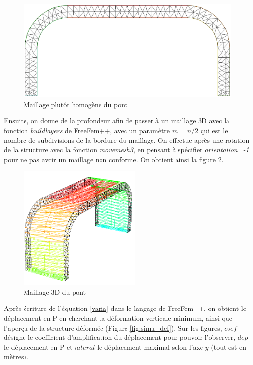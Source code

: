 \begin{solution}
\begin{figure}
\begin{center}
            \includegraphics[width=12cm]{imgs/all_maillage_pondere.PNG}
            \caption{Maillage plutôt homogène du pont}
            \label{fig:maillage_pondere}
        
        \end{center}
    \end{figure}

    Ensuite, on donne de la profondeur afin de passer à un maillage 3D avec la fonction \emph{buildlayers} de FreeFem++, 
    avec un paramètre $m=n/2$ qui est le nombre de subdivisions de la bordure du maillage. On effectue après une rotation de la structure 
    avec la fonction \emph{movemesh3}, en pensant à spécifier \emph{orientation=-1} pour ne pas avoir un maillage non conforme.
    On obtient ainsi la figure \ref{fig:maillage_3d}.

    
    \begin{figure}        
        \begin{center}
        
            \includegraphics[width=6cm]{imgs/all_maillage_3d.PNG}
            \caption{Maillage 3D du pont}
            \label{fig:maillage_3d}
        
        \end{center}
    \end{figure}

    Après écriture de l'équation \ref{varia} dans le langage de FreeFem++, on obtient le déplacement en P en cherchant la déformation verticale minimum, ainsi que 
    l'aperçu de la structure déformée (Figure \ref{fig:simu_def}). 
    Sur les figures, $coef$ désigne le coefficient d'amplification du déplacement pour pouvoir l'observer, $dep$ le déplacement en P et $lateral$ 
    le déplacement maximal selon l'axe $y$ (tout est en mètres).
    

\end{solution}
